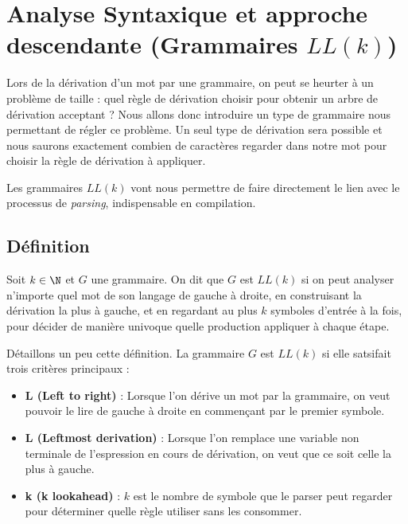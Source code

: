 

\section{Analyse Syntaxique et approche descendante (Grammaires $LL(k)$)}

Lors de la dérivation d'un mot par une grammaire, on peut se heurter à un problème de taille : quel règle de dérivation choisir 
pour obtenir un arbre de dérivation acceptant ? 
Nous allons donc introduire un type de grammaire nous permettant de régler ce problème. Un seul type de dérivation 
sera possible et nous saurons exactement combien de caractères regarder dans notre mot pour choisir la règle 
de dérivation à appliquer. 

Les grammaires $LL(k)$ vont nous permettre de faire directement le lien avec le processus de \emph{parsing}, indispensable 
en compilation. 

\subsection{Définition}

\begin{definition}[Grammaire $LL(k)$]
    Soit $k \in \N$ et $G$ une grammaire. On dit que $G$ est $LL(k)$ si on peut analyser n’importe quel mot 
    de son langage de gauche à droite, en construisant la dérivation la plus à gauche, et en regardant au plus $k$ 
    symboles d’entrée à la fois, pour décider de manière univoque quelle production appliquer à chaque étape.
\end{definition}

\begin{remark}
    Détaillons un peu cette définition. La grammaire $G$ est $LL(k)$ si elle satsifait trois critères 
    principaux : 
    \begin{itemize}
        \item \textbf{L (Left to right)} : Lorsque l'on dérive un mot par la grammaire, on veut pouvoir 
        le lire de gauche à droite en commençant par le premier symbole. 
        \item \textbf{L (Leftmost derivation)} : Lorsque l'on remplace une variable non terminale 
        de l'espression en cours de dérivation, on veut que ce soit celle la plus à gauche. 
        \item \textbf{k (k lookahead)} : $k$ est le nombre de symbole que le parser peut regarder 
        pour déterminer quelle règle utiliser sans les consommer. 
    \end{itemize}
\end{remark}

